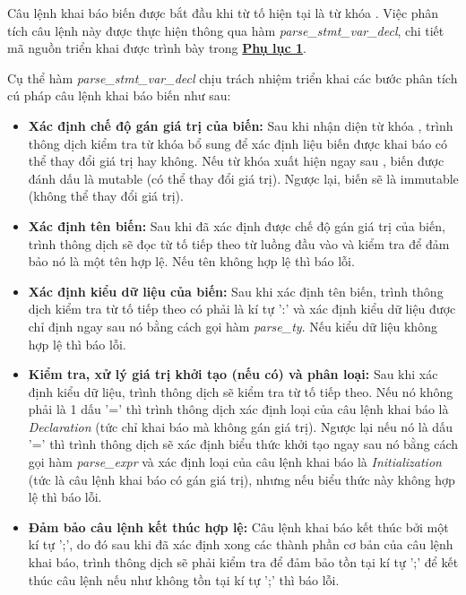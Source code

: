 Câu lệnh khai báo biến được bắt đầu khi từ tố hiện tại là từ khóa . Việc phân tích câu lệnh này được thực hiện thông qua hàm \textit{parse\_stmt\_var\_decl}, chi tiết mã nguồn triển khai được trình bày trong \hyperref[ap1:stmt_decl_var]{\bf Phụ lục 1}. %

Cụ thể hàm \textit{parse\_stmt\_var\_decl} chịu trách nhiệm triển khai các bước phân tích cú pháp câu lệnh khai báo biến như sau:

\begin{itemize}
    \item \textbf{Xác định chế độ gán giá trị của biến:}
    Sau khi nhận diện từ khóa , trình thông dịch kiểm tra từ khóa bổ sung để xác định liệu biến được khai báo có thể thay đổi giá trị hay không. Nếu từ khóa  xuất hiện ngay sau , biến được đánh dấu là mutable (có thể thay đổi giá trị). Ngược lại, biến sẽ là immutable (không thể thay đổi giá trị).
    \item \textbf{Xác định tên biến:}
    Sau khi đã xác định được chế độ gán giá trị của biến, trình thông dịch sẽ đọc từ tố tiếp theo từ luồng đầu vào và kiểm tra để đảm bảo nó là một tên hợp lệ. Nếu tên không hợp lệ thì báo lỗi. 
    \item \textbf{Xác định kiểu dữ liệu của biến:}
    Sau khi xác định tên biến, trình thông dịch kiểm tra từ tố tiếp theo có phải là kí tự ':' và xác định kiểu dữ liệu được chỉ định ngay sau nó bằng cách gọi hàm \textit{parse\_ty}. Nếu kiểu dữ liệu không hợp lệ thì báo lỗi. 
    \item \textbf{Kiểm tra, xử lý giá trị khởi tạo (nếu có) và phân loại:}
    Sau khi xác định kiểu dữ liệu, trình thông dịch sẽ kiểm tra từ tố tiếp theo. Nếu nó không phải là 1 dấu '=' thì trình thông dịch xác định loại của câu lệnh khai báo là \textit{Declaration} (tức chỉ khai báo mà không gán giá trị). Ngược lại nếu nó là dấu '=' thì trình thông dịch sẽ xác định biểu thức khởi tạo ngay sau nó bằng cách gọi hàm \textit{parse\_expr} và xác định loại của câu lệnh khai báo là \textit{Initialization} (tức là câu lệnh khai báo có gán giá trị), nhưng nếu biểu thức này không hợp lệ thì báo lỗi. 
    \item \textbf{Đảm bảo câu lệnh kết thúc hợp lệ:}
    Câu lệnh khai báo kết thúc bởi một kí tự ';', do đó sau khi đã xác định xong các thành phần cơ bản của câu lệnh khai báo, trình thông dịch sẽ phải kiểm tra để đảm bảo tồn tại kí tự ';' để kết thúc câu lệnh nếu như không tồn tại kí tự ';' thì báo lỗi.
\end{itemize}


